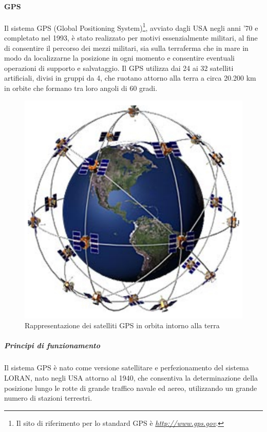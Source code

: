 \paragraph{GPS}
Il sistema GPS (Global Positioning System)\footnote{Il sito di riferimento per lo standard GPS è \emph{\url{http://www.gps.gov}}.}, avviato dagli USA negli anni '70 e completato nel 1993, è stato realizzato per motivi essenzialmente militari, al fine di consentire il percorso dei mezzi militari, sia sulla terraferma che in mare in modo da localizzarne la posizione in ogni momento e consentire eventuali operazioni di supporto e salvataggio.
Il GPS utilizza dai 24 ai 32 satelliti artificiali, divisi in gruppi da 4, che ruotano attorno alla terra a circa 20.200 km in orbite che formano tra loro angoli di 60 gradi.

\begin{figure}
\begin{center}

\includegraphics[scale=0.3]{imgs/gpssatelliteimage.jpg}
\caption{Rappresentazione dei satelliti GPS in orbita intorno alla terra\label{gpsimage}}
\end{center}

\end{figure}

\subparagraph{Principi di funzionamento}
Il sistema GPS è nato come versione satellitare e perfezionamento del sistema LORAN, nato negli USA attorno al 1940, che consentiva la determinazione della posizione lungo le rotte di grande traffico navale ed aereo, utilizzando un grande numero di stazioni terrestri.

